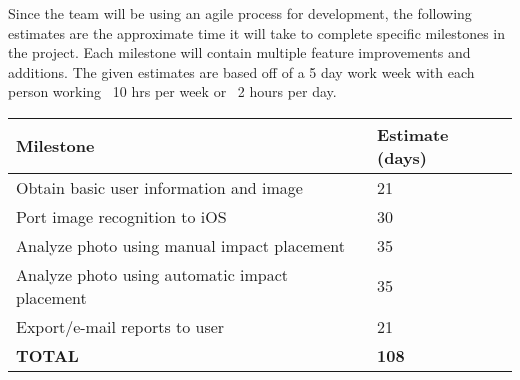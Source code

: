 Since the team will be using an agile process for development, the following estimates are the approximate time it will take to complete specific milestones in the project.  Each milestone will contain multiple feature improvements and additions.  The given estimates are based off of a 5 day work week with each person working ~10 hrs per week or ~2 hours per day.\\

\begin{tabular}{l l}
{\bf Milestone} & {\bf Estimate (days)} \\ \hline
Obtain basic user information and image & 21 \\
Port image recognition to iOS & 30 \\
Analyze photo using manual impact placement & 35 \\
Analyze photo using automatic impact placement & 35 \\
Export/e-mail reports to user & 21\\ \hline
{\bf TOTAL} & {\bf 108} \\
\end{tabular}

